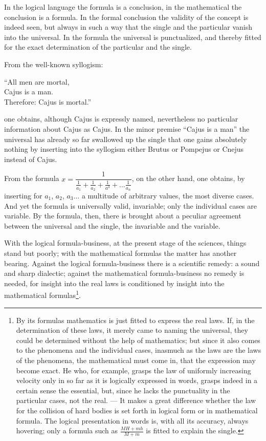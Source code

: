 \documentclass[12pt]{book}
\begin{document}
In the logical language the formula is a conclusion, in the mathematical the
conclusion is a formula. In the formal conclusion the validity of the concept is
indeed seen, but always in such a way that the single and the particular vanish
into the universal. In the formula the universal is punctualized, and thereby
fitted for the exact determination of the particular and the single.

From the well-known syllogism:
\begin{center}
``All men are mortal,\\
Cajus is a man.\\
Therefore: Cajus is mortal.''
\end{center}
one obtains, although Cajus is expressly named, nevertheless no particular
information about Cajus as Cajus. In the minor premise ``Cajus is a man'' the
universal has already so far swallowed up the single that one gains absolutely
nothing by inserting into the syllogism either Brutus or Pompejus or Cnejus
instead of Cajus.

From the formula $x = \dfrac{1}{\frac{1}{a_1}+\frac{1}{a_2}+\frac{1}{a^{3}}+\dots
\frac{1}{a_n}}$, on the other hand, one obtains, by inserting for $a_1$, $a_2$,
$a_3\dots$ a multitude of arbitrary values, the most diverse cases. And yet the
formula is universally valid, invariable; only the individual cases are
variable. By the formula, then, there is brought about a peculiar agreement
between the universal and the single, the invariable and the variable.

With the logical formula-business, at the present stage of the sciences, things
stand but poorly; with the mathematical formulas the matter has another bearing.
Against the logical formula-business there is a scientific remedy: a sound and
sharp dialectic; against the mathematical formula-business no remedy is needed,
for insight into the real laws is conditioned by insight into the mathematical
formulas\footnote{By its formulas mathematics is just fitted to express the real
laws. If, in the determination of these laws, it merely came to naming the
universal, they could be determined without the help of mathematics; but since it
also comes to the phenomena and the individual cases, inasmuch as the laws are
the laws of the phenomena, the mathematical must come in, that the expression may
become exact. He who, for example, grasps the law of uniformly increasing
velocity only in so far as it is logically expressed in words, grasps indeed in a
certain sense the essential, but, since he lacks the punctuality in the
particular cases, not the real. --- It makes a great difference whether the law
for the collision of hard bodies is set forth in logical form or in mathematical
formula. The logical presentation in words is, with all its accuracy, always
hovering; only a formula such as $\frac{MH+mh}{M+m}$ is fitted to explain the
single.}.
\end{document}
